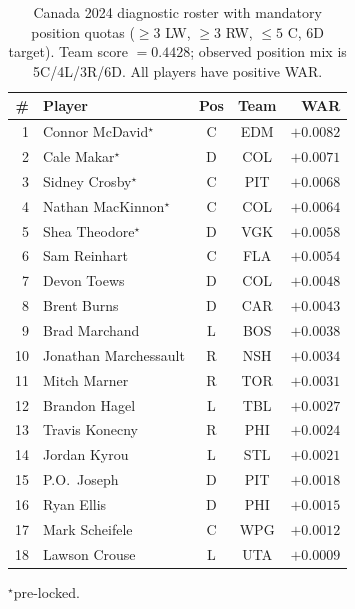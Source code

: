 \documentclass[11pt,letterpaper]{article}
\begin{document}
\begin{table}[htbp]
  \centering
  \small
  \caption{Canada 2024 diagnostic roster with mandatory position quotas
    ($\geq 3$ LW, $\geq 3$ RW, $\leq 5$ C, 6D target). Team score
    $= 0.4428$; observed position mix is 5C/4L/3R/6D. All players have
    positive WAR.}
  \begin{tabular}{r l c c r}
    \toprule
    \# & Player & Pos & Team & WAR \\
    \midrule
    1  & Connor McDavid$^{\star}$        & C & EDM & $+0.0082$ \\
    2  & Cale Makar$^{\star}$            & D & COL & $+0.0071$ \\
    3  & Sidney Crosby$^{\star}$         & C & PIT & $+0.0068$ \\
    4  & Nathan MacKinnon$^{\star}$      & C & COL & $+0.0064$ \\
    5  & Shea Theodore$^{\star}$         & D & VGK & $+0.0058$ \\
    6  & Sam Reinhart                    & C & FLA & $+0.0054$ \\
    7  & Devon Toews                     & D & COL & $+0.0048$ \\
    8  & Brent Burns                     & D & CAR & $+0.0043$ \\
    9  & Brad Marchand                   & L & BOS & $+0.0038$ \\
    10 & Jonathan Marchessault           & R & NSH & $+0.0034$ \\
    11 & Mitch Marner                    & R & TOR & $+0.0031$ \\
    12 & Brandon Hagel                   & L & TBL & $+0.0027$ \\
    13 & Travis Konecny                  & R & PHI & $+0.0024$ \\
    14 & Jordan Kyrou                    & L & STL & $+0.0021$ \\
    15 & P.O.\ Joseph                    & D & PIT & $+0.0018$ \\
    16 & Ryan Ellis                      & D & PHI & $+0.0015$ \\
    17 & Mark Scheifele                  & C & WPG & $+0.0012$ \\
    18 & Lawson Crouse                   & L & UTA & $+0.0009$ \\
    \bottomrule
  \end{tabular}
  \par \footnotesize{$^{\star}$pre-locked.}
\end{table}
\end{document}
